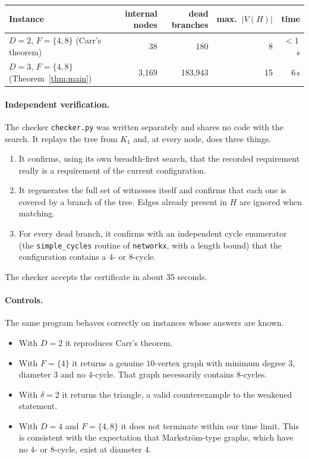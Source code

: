 \documentclass[11pt]{article}
\theoremstyle{remark}
\begin{document}
\begin{center}
\begin{tabular}{@{}lrrrr@{}}
\toprule
Instance & internal nodes & dead branches & max.\ $|V(H)|$ & time\\
\midrule
$D=2$, $F=\{4,8\}$ (Carr's theorem) & 38 & 180 & 8 & $<1$\,s\\
$D=3$, $F=\{4,8\}$ (Theorem~\ref{thm:main}) & 3{,}169 & 183{,}943 & 15 & 6\,s\\
\bottomrule
\end{tabular}
\end{center}

\paragraph{Independent verification.} The checker \texttt{checker.py} was written separately and
shares no code with the search. It replays the tree from $K_1$ and, at every node, does three
things.
\begin{enumerate}
\item It confirms, using its own breadth-first search, that the recorded requirement really is a
  requirement of the current configuration.
\item It regenerates the full set of witnesses itself and confirms that each one is covered by a
  branch of the tree. Edges already present in $H$ are ignored when matching.
\item For every dead branch, it confirms with an independent cycle enumerator
  (the \texttt{simple\_cycles} routine of \texttt{networkx}, with a length bound) that the configuration contains a $4$- or
  $8$-cycle.
\end{enumerate}
The checker accepts the certificate in about 35 seconds.

\paragraph{Controls.} The same program behaves correctly on instances whose answers are known.
\begin{itemize}
\item With $D=2$ it reproduces Carr's theorem.
\item With $F=\{4\}$ it returns a genuine $10$-vertex graph with minimum degree $3$, diameter $3$
  and no $4$-cycle. That graph necessarily contains $8$-cycles.
\item With $\delta=2$ it returns the triangle, a valid counterexample to the weakened statement.
\item With $D=4$ and $F=\{4,8\}$ it does not terminate within our time limit. This is consistent
  with the expectation that Markstr\"om-type graphs, which have no $4$- or $8$-cycle, exist at
  diameter $4$.
\end{itemize}
\end{document}
